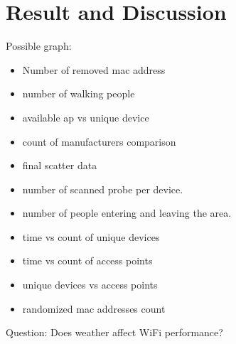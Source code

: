 \chapter{Result and Discussion}\label{ch:result-discussion} %
Possible graph:
\begin{itemize}
	\item Number of removed mac address
	\item number of walking people
	\item available ap vs unique device
	\item count of manufacturers comparison
	\item final scatter data
	\item number of scanned probe per device.
	\item number of people entering and leaving the area.
	\item time vs count of unique devices
	\item time vs count of access points
	\item unique devices vs access points
	\item randomized mac addresses count
\end{itemize}

Question: Does weather affect WiFi performance?

